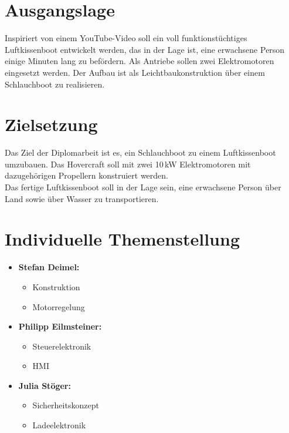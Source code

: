 \section{Ausgangslage}
Inspiriert von einem YouTube-Video\textsuperscript{\cite{YoutubeVideo}} soll ein voll funktionstüchtiges Luftkissenboot entwickelt werden, das in der Lage ist, eine erwachsene Person einige Minuten lang zu befördern. Als Antriebe sollen zwei Elektromotoren eingesetzt werden. Der Aufbau ist als Leichtbaukonstruktion über einem Schlauchboot zu realisieren.

\section{Zielsetzung}
Das Ziel der Diplomarbeit ist es, ein Schlauchboot zu einem Luftkissenboot umzubauen. Das Hovercraft soll mit zwei 10\,kW Elektromotoren mit dazugehörigen Propellern konstruiert werden.\\
Das fertige Luftkissenboot soll in der Lage sein, eine erwachsene Person über Land sowie über Wasser zu transportieren.

\section{Individuelle Themenstellung}
\begin{itemize}
    \item \textbf{Stefan Deimel:}
    \begin{itemize}
      \item Konstruktion
      \item Motorregelung
    \end{itemize}
    \item \textbf{Philipp Eilmsteiner:}
    \begin{itemize}
      \item Steuerelektronik
      \item HMI
    \end{itemize}
    \item \textbf{Julia Stöger:}
    \begin{itemize}
      \item Sicherheitskonzept
      \item Ladeelektronik
    \end{itemize}
\end{itemize}
